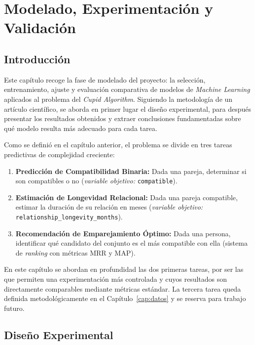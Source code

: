 \chapter{Modelado, Experimentación y Validación}
\label{cap:modelado}

\section{Introducción}
\label{sec:intro_modelado}

Este capítulo recoge la fase de modelado del proyecto: la selección, entrenamiento, ajuste y evaluación comparativa de modelos de \textit{Machine Learning} aplicados al problema del \textit{Cupid Algorithm}. Siguiendo la metodología de un artículo científico, se aborda en primer lugar el diseño experimental, para después presentar los resultados obtenidos y extraer conclusiones fundamentadas sobre qué modelo resulta más adecuado para cada tarea.

Como se definió en el capítulo anterior, el problema se divide en tres tareas predictivas de complejidad creciente:

\begin{enumerate}
    \item \textbf{Predicción de Compatibilidad Binaria:} Dada una pareja, determinar si son compatibles o no (\textit{variable objetivo:} \texttt{compatible}).
    \item \textbf{Estimación de Longevidad Relacional:} Dada una pareja compatible, estimar la duración de su relación en meses (\textit{variable objetivo:} \texttt{relationship\_longevity\_months}).
    \item \textbf{Recomendación de Emparejamiento Óptimo:} Dada una persona, identificar qué candidato del conjunto es el más compatible con ella (sistema de \textit{ranking} con métricas MRR y MAP).
\end{enumerate}

En este capítulo se abordan en profundidad las dos primeras tareas, por ser las que permiten una experimentación más controlada y cuyos resultados son directamente comparables mediante métricas estándar. La tercera tarea queda definida metodológicamente en el Capítulo~\ref{cap:datos} y se reserva para trabajo futuro.

\section{Diseño Experimental}
\label{sec:disenio_experimental}

